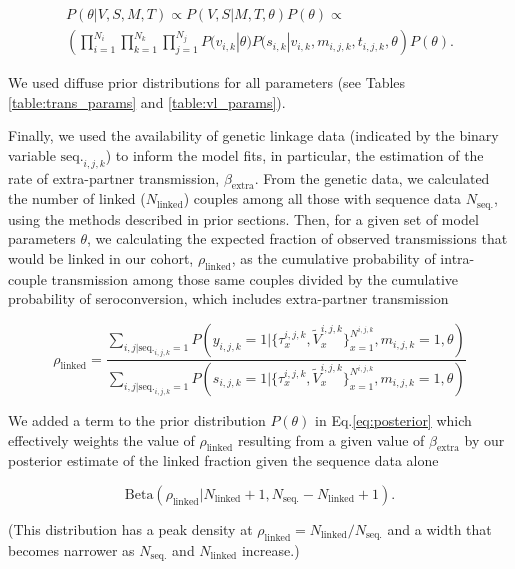 \documentclass{article}[11pt]
\begin{document}
\begin{multline}
P(\theta | V,S, M, T) \propto P(V,S | M,T,\theta)P(\theta) \propto \\
\left(\prod_{i=1}^{N_i} \prod_{k=1}^{N_k} \prod_{j=1}^{N_j} P(v_{i,k} | \theta)P(s_{i,k}|v_{i,k},  m_{i,j,k}, t_{i,j,k},  \theta \right)P(\theta).
\label{eq:posterior}
\end{multline}

We used diffuse prior distributions for all parameters (see Tables \ref{table:trans_params} and \ref{table:vl_params}).


Finally, we used the availability of genetic linkage data (indicated by the binary variable $\text{seq.}_{i,j,k}$) to inform the model fits, in particular, the estimation of the rate of extra-partner transmission, $\beta_\text{extra}$. From the genetic data, we calculated
the number of linked ($N_{\text{linked}}$) couples among all those with sequence data $N_\text{seq.}$, using the methods described in prior sections. Then, for a given set of model parameters $\theta$, we calculating the expected fraction of observed transmissions that would be linked in our cohort,  $\rho_\text{linked}$, as the cumulative probability of intra-couple transmission among those same couples divided by the cumulative probability of seroconversion, which includes extra-partner transmission 

\begin{equation}
\rho_\text{linked} = \frac{\sum_{i,j | \text{seq.}_{i,j,k} = 1} P(y_{i,j,k}=1|\{\tau_{x}^{i,j,k}, \tilde{V}_x^{i,j,k} \}_{x=1}^{N^{i,j,k}}, m_{i,j,k}=1, \theta)}{\sum_{i,j | \text{seq.}_{i,j,k} = 1} P(s_{i,j,k}=1|\{\tau_{x}^{i,j,k}, \tilde{V}_x^{i,j,k} \}_{x=1}^{N^{i,j,k}}, m_{i,j,k}=1, \theta) }
\end{equation}

We added a term to the prior distribution $P(\theta)$ in Eq.\eqref{eq:posterior} which effectively weights the value of $\rho_\text{linked}$ resulting from a given value of $\beta_\text{extra}$ by our posterior estimate of the linked fraction given the sequence data alone

\begin{equation}
\text{Beta}(\rho_\text{linked} | N_\text{linked}+1,N_\text{seq.}-N_\text{linked} + 1).
\end{equation}

(This distribution has a peak density at $\rho_\text{linked} = N_\text{linked}/N_\text{seq.}$ and a width that becomes narrower as $N_\text{seq.}$ and $N_\text{linked}$ increase.) 
\end{document}
